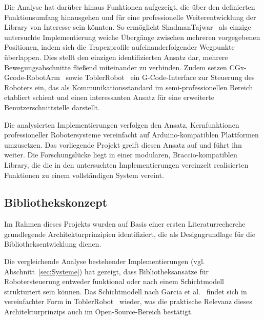 \documentclass[12pt,a4paper]{article}
\begin{document}
Die Analyse hat darüber hinaus Funktionen aufgezeigt, die über den definierten Funktionsumfang hinausgehen und für eine professionelle Weiterentwicklung der Library von Interesse sein könnten. So ermöglicht ShadmanTajwar~\cite{ShadmanTajwar.2023} als einzige untersuchte Implementierung weiche Übergänge zwischen mehreren vorgegebenen Positionen, indem sich die Trapezprofile aufeinanderfolgender Wegpunkte überlappen. Dies stellt den einzigen identifizierten Ansatz dar, mehrere Bewegungsabschnitte 
fließend miteinander zu verbinden. Zudem setzen CGx-Gcode-RobotArm~\cite{cgxeiji.2018} sowie ToblerRobot~\cite{KANCHANAKALANAPERERA.5172026} ein G-Code-Interface zur Steuerung des Roboters ein, das als Kommunikationsstandard im semi-professionellen Bereich etabliert schient und einen interessanten Ansatz für eine erweiterte Benutzerschnittstelle darstellt. 

Die analysierten Implementierungen verfolgen den Ansatz, Kernfunktionen professioneller Robotersysteme vereinfacht auf Arduino-kompatiblen Plattformen umzusetzen. Das vorliegende Projekt greift diesen Ansatz auf und führt ihn weiter. Die Forschungslücke liegt in einer modularen, Braccio-kompatiblen Library, die die in den untersuchten Implementierungen vereinzelt realisierten Funktionen zu einem vollständigen System vereint.

\subsection{Bibliothekskonzept}
\label{sec:bibliothekskonzept}

Im Rahmen dieses Projekts wurden auf Basis einer ersten Literaturrecherche grundlegende Architekturprinzipien identifiziert, die als Designgrundlage für die Bibliotheksentwicklung dienen. 

Die vergleichende Analyse bestehender Implementierungen (vgl. Abschnitt~\ref{sec:Systeme}) hat gezeigt, dass Bibliotheksansätze für Robotersteuerung entweder funktional oder nach einem Schichtmodell strukturiert sein können. Das Schichtmodell nach Garcia et al.~\cite{J.GaimezGarciaJ.GomezOrtegaL.NietoNietoandA.SanchezGarcia.2007} findet sich in vereinfachter Form in ToblerRobot~\cite{KANCHANAKALANAPERERA.5172026} wieder, was die praktische Relevanz dieses Architekturprinzips auch im Open-Source-Bereich bestätigt. 
\end{document}
